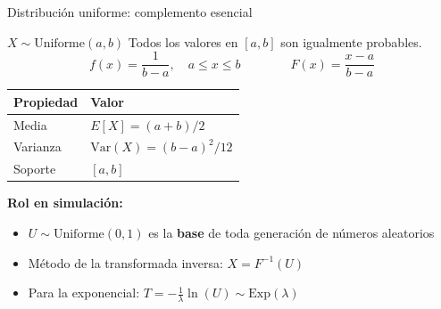 \documentclass[aspectratio=1610, 9pt]{beamer}
\begin{document}
\begin{frame}{Distribuci\'{o}n uniforme: complemento esencial}

\begin{block}{$X \sim \text{Uniforme}(a, b)$}
Todos los valores en $[a,b]$ son igualmente probables.
\[
f(x) = \frac{1}{b-a}, \quad a \leq x \leq b \qquad\qquad F(x) = \frac{x-a}{b-a}
\]
\end{block}

\vspace{0.2cm}
\renewcommand{\arraystretch}{1.4}
\begin{center}
\begin{tabular}{ll}
\toprule
\textbf{Propiedad} & \textbf{Valor} \\
\midrule
Media & $E[X] = (a+b)/2$ \\
Varianza & $\text{Var}(X) = (b-a)^2/12$ \\
Soporte & $[a, b]$ \\
\bottomrule
\end{tabular}
\end{center}

\vspace{0.3cm}
\textbf{Rol en simulaci\'{o}n:}
\begin{itemize}
    \item $U \sim \text{Uniforme}(0,1)$ es la \textbf{base} de toda generaci\'{o}n de n\'{u}meros aleatorios
    \item M\'{e}todo de la transformada inversa: $X = F^{-1}(U)$
    \item Para la exponencial: $T = -\frac{1}{\lambda}\ln(U) \sim \text{Exp}(\lambda)$
\end{itemize}
\end{frame}
\end{document}
